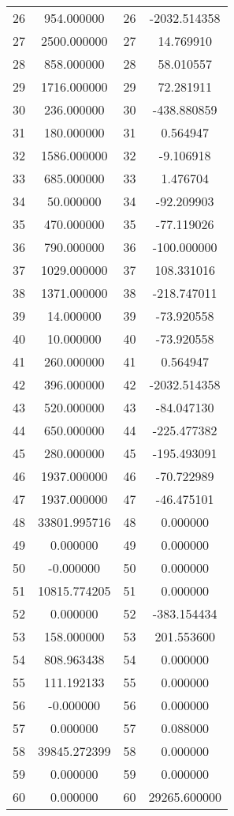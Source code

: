 \documentclass[12pt]{article}
\begin{document}
\begin{longtable}{@{}cccc@{}}
26 & 954.000000 & 26 & -2032.514358 \\
27 & 2500.000000 & 27 & 14.769910 \\
28 & 858.000000 & 28 & 58.010557 \\
29 & 1716.000000 & 29 & 72.281911 \\
30 & 236.000000 & 30 & -438.880859 \\
31 & 180.000000 & 31 & 0.564947 \\
32 & 1586.000000 & 32 & -9.106918 \\
33 & 685.000000 & 33 & 1.476704 \\
34 & 50.000000 & 34 & -92.209903 \\
35 & 470.000000 & 35 & -77.119026 \\
36 & 790.000000 & 36 & -100.000000 \\
37 & 1029.000000 & 37 & 108.331016 \\
38 & 1371.000000 & 38 & -218.747011 \\
39 & 14.000000 & 39 & -73.920558 \\
40 & 10.000000 & 40 & -73.920558 \\
41 & 260.000000 & 41 & 0.564947 \\
42 & 396.000000 & 42 & -2032.514358 \\
43 & 520.000000 & 43 & -84.047130 \\
44 & 650.000000 & 44 & -225.477382 \\
45 & 280.000000 & 45 & -195.493091 \\
46 & 1937.000000 & 46 & -70.722989 \\
47 & 1937.000000 & 47 & -46.475101 \\
48 & 33801.995716 & 48 & 0.000000 \\
49 & 0.000000 & 49 & 0.000000 \\
50 & -0.000000 & 50 & 0.000000 \\
51 & 10815.774205 & 51 & 0.000000 \\
52 & 0.000000 & 52 & -383.154434 \\
53 & 158.000000 & 53 & 201.553600 \\
54 & 808.963438 & 54 & 0.000000 \\
55 & 111.192133 & 55 & 0.000000 \\
56 & -0.000000 & 56 & 0.000000 \\
57 & 0.000000 & 57 & 0.088000 \\
58 & 39845.272399 & 58 & 0.000000 \\
59 & 0.000000 & 59 & 0.000000 \\
60 & 0.000000 & 60 & 29265.600000 \\

\end{longtable}
\end{document}
